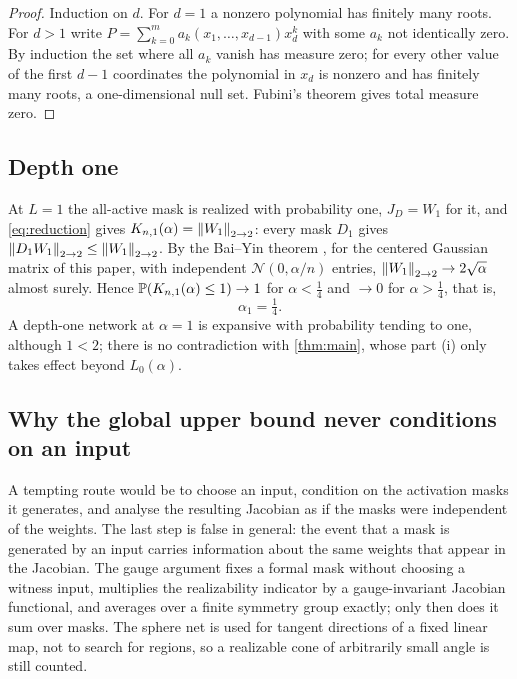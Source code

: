\begin{proof}
Induction on $d$. For $d=1$ a nonzero polynomial has finitely many roots. For $d>1$ write $P=\sum_{k=0}^ma_k(x_1,\dots,x_{d-1})x_d^k$ with some $a_k$ not identically zero. By induction the set where all $a_k$ vanish has measure zero; for every other value of the first $d-1$ coordinates the polynomial in $x_d$ is nonzero and has finitely many roots, a one-dimensional null set. Fubini's theorem gives total measure zero.
\end{proof}



\subsection{Depth one}

At $L=1$ the all-active mask is realized with probability one, $J_D=W_1$ for it, and \cref{eq:reduction} gives $K_{n,1}(\alpha)=\left\lVert W_1\right\rVert_{2\to 2}$: every mask $D_1$ gives $\left\lVert D_1W_1\right\rVert_{2\to 2}\le\left\lVert W_1\right\rVert_{2\to 2}$. By the Bai--Yin theorem \cite{baiyin}, for the centered Gaussian matrix of this paper, with independent $\mathcal N(0,\alpha/n)$ entries, $\left\lVert W_1\right\rVert_{2\to 2}\to2\sqrt\alpha$ almost surely. Hence $\mathbb{P}(K_{n,1}(\alpha)\le1)\to1$ for $\alpha<\tfrac14$ and $\to0$ for $\alpha>\tfrac14$, that is,
\[
\alpha_1=\tfrac14 .
\]
A depth-one network at $\alpha=1$ is expansive with probability tending to one, although $1<2$; there is no contradiction with \cref{thm:main}, whose part (i) only takes effect beyond $L_0(\alpha)$.

\subsection{Why the global upper bound never conditions on an input}

A tempting route would be to choose an input, condition on the activation masks it generates, and analyse the resulting Jacobian as if the masks were independent of the weights. The last step is false in general: the event that a mask is generated by an input carries information about the same weights that appear in the Jacobian. The gauge argument fixes a formal mask without choosing a witness input, multiplies the realizability indicator by a gauge-invariant Jacobian functional, and averages over a finite symmetry group exactly; only then does it sum over masks. The sphere net is used for tangent directions of a fixed linear map, not to search for regions, so a realizable cone of arbitrarily small angle is still counted.

